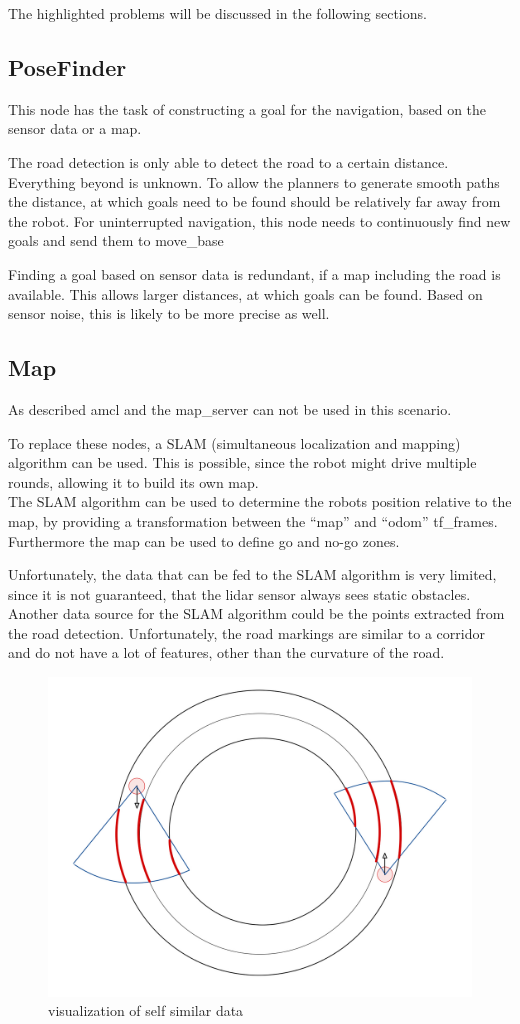 The highlighted problems will be discussed in the following sections.



\subsection{PoseFinder}

This node has the task of constructing a goal for the navigation, based on the sensor data or a map.

The road detection is only able to detect the road to a certain distance. Everything beyond is unknown. 
To allow the planners to generate smooth paths the distance, at which goals need to be found should be relatively far away from the robot.
For uninterrupted navigation, this node needs to continuously find new goals and send them to move\_base

Finding a goal based on sensor data is redundant, if a map including the road is available. This allows larger distances, at which goals can be found. Based on sensor noise, this is likely to be more precise as well.

\subsection{Map}
As described amcl and the map\_server can not be used in this scenario.

To replace these nodes, a SLAM (simultaneous localization and mapping) algorithm can be used.
This is possible, since the robot might drive multiple rounds, allowing it to build its own map.\\

The SLAM algorithm can be used to determine the robots position relative to the map, by providing a transformation between the ``map'' and ``odom'' tf\_frames. Furthermore the map can be used to define go and no-go zones.

Unfortunately, the data that can be fed to the SLAM algorithm is very limited, since it is not guaranteed, that the lidar sensor always sees static obstacles. Another data source for the SLAM algorithm could be the points extracted from the road detection. Unfortunately, the road markings are similar to a corridor and do not have a lot of features, other than the curvature of the road.\\

\begin{figure}[H]
	\centering
	\includegraphics[width=.5\textwidth]{Pictures/selfsimillar}
	\caption{visualization of self similar data}
	\label{selfsimilar}
\end{figure}

